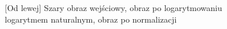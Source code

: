 \documentclass[a4paper,12pt, titlepage]{report}
\begin{document}
\begin{figure}[h]
    \centering
    \caption{[Od lewej] Szary obraz wejściowy, obraz po logarytmowaniu logarytmem naturalnym, obraz po normalizacji}%
    \label{fig:rysunek}%
\end{figure}
\FloatBarrier
\end{document}
